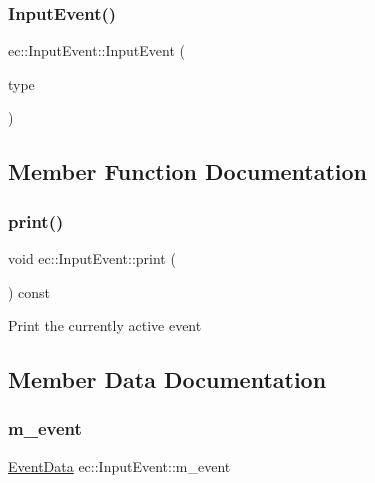 \subsubsection{\texorpdfstring{Input\+Event()}{InputEvent()}\hspace{0.1cm}{\footnotesize\ttfamily [2/2]}}
{\footnotesize\ttfamily ec\+::\+Input\+Event\+::\+Input\+Event (\begin{DoxyParamCaption}\item[{\mbox{\hyperlink{namespaceec_ae2d697393ea83b34b18ab14eb5dacbca}{Input\+Type}}}]{type }\end{DoxyParamCaption})\hspace{0.3cm}{\ttfamily [explicit]}}



\subsection{Member Function Documentation}
\mbox{\label{structec_1_1_input_event_a778cd0afc60db1b127585a54c61b9e75}} 
\subsubsection{\texorpdfstring{print()}{print()}}
{\footnotesize\ttfamily void ec\+::\+Input\+Event\+::print (\begin{DoxyParamCaption}{ }\end{DoxyParamCaption}) const}

Print the currently active event 

\subsection{Member Data Documentation}
\mbox{\label{structec_1_1_input_event_a10c6d0183b009da26bac115528c3da36}} 
\subsubsection{\texorpdfstring{m\+\_\+event}{m\_event}}
{\footnotesize\ttfamily \mbox{\hyperlink{unionec_1_1_event_data}{Event\+Data}} ec\+::\+Input\+Event\+::m\+\_\+event}

